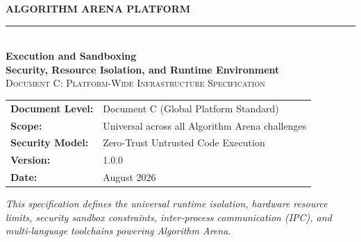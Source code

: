 \documentclass[11pt,a4paper]{article}
\newcommand{\docversion}{1.0.0}
\newcommand{\docdate}{August 2026}
\begin{document}
\hypersetup{pageanchor=false}
\begin{titlepage}

    \centering
    \vspace*{1.0cm}

    {\Large\textbf{\color{arenaBlue}ALGORITHM ARENA PLATFORM}}\\[0.4cm]
    {\color{codegray!60}\rule{0.5\textwidth}{0.8pt}}\\[1.2cm]

    {\fontsize{26}{34}\selectfont\textbf{Execution and Sandboxing}}\\[0.4cm]
    {\Large\color{arenaBlue}\textbf{Security, Resource Isolation, and Runtime Environment}}\\[1.2cm]

    {\large\textsc{Document C: Platform-Wide Infrastructure Specification}}\\[1.5cm]

    \begin{tabular}{ll}
        \toprule
        \textbf{Document Level:}     & Document C (Global Platform Standard) \\
        \textbf{Scope:}              & Universal across all Algorithm Arena challenges \\
        \textbf{Security Model:}     & Zero-Trust Untrusted Code Execution \\
        \textbf{Version:}            & \docversion \\
        \textbf{Date:}               & \docdate \\
        \bottomrule
    \end{tabular}

    \vfill

    \parbox{0.85\textwidth}{
        \centering\textit{
            This specification defines the universal runtime isolation,
            hardware resource limits, security sandbox constraints,
            inter-process communication (IPC), and multi-language toolchains
            powering Algorithm Arena.
        }
    }

\end{titlepage}
\hypersetup{pageanchor=true}

\tableofcontents
\newpage
{}
\end{document}
